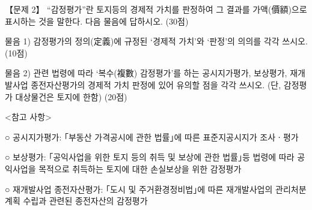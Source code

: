 \begin{longquestion}{【문제 2】}
“감정평가”란 토지등의 경제적 가치를 판정하여 그 결과를 가액(價額)으로 표시하는 것을 말한다. 다음 물음에 답하시오. (30점) \par
\medskip\noindent 물음 1) 감정평가의 정의(定義)에 규정된 ‘경제적 가치’와 ‘판정’의 의의를 각각 쓰시오. (10점) \par
\medskip\noindent 물음 2) 관련 법령에 따라 ‘복수(複數) 감정평가’를 하는 공시지가평가, 보상평가, 재개발사업 종전자산평가의 경제적 가치 판정에 있어 유의할 점을 각각 쓰시오. (단, 감정평가 대상물건은 토지에 한함) (20점) \par
\begin{framedtext}
\centerline{<참고 사항>}
○ 공시지가평가: ｢부동산 가격공시에 관한 법률｣에 따른 표준지공시지가 조사ㆍ평가 \par
○ 보상평가: ｢공익사업을 위한 토지 등의 취득 및 보상에 관한 법률｣등 법령에 따라 공익사업을 목적으로 취득하는 토지에 대한 손실보상을 위한 감정평가 \par
○ 재개발사업 종전자산평가: ｢도시 및 주거환경정비법｣에 따른 재개발사업의 관리처분계획 수립과 관련된 종전자산의 감정평가 \par
\end{framedtext}
\end{longquestion}
